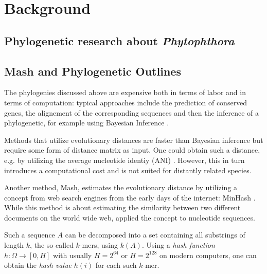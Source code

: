 
\chapter{Background}
  \label{sec:background}

\section{Phylogenetic research about \textit{Phytophthora}}


\section{Mash and Phylogenetic Outlines}
The phylogenies discussed above are expensive both in terms of labor and in
terms of computation: typical approaches include the prediction of conserved
genes, the alignement of the corresponding sequences and then the inference of a
phylogenetic, for example using Bayesian Inference
\cite{abadPhytophthoraTaxonomicPhylogenetic2023a,winkworthComparativeAnalysesComplete2022}.

Methods that utilize evolutionary distances
\cite{saitouNeighborjoiningMethodNew1987} are faster  than Bayesian
inference but require some form of distance matrix as input. One could obtain
such a distance, e.g. by utilizing the average nucleotide identiy (ANI)
\cite{leeOrthoANIImprovedAlgorithm2016}. However, this in turn introduces a
computational cost and is not suited for distantly related species.

Another method, Mash, estimates the evolutionary distance by utilizing a concept
from web search engines from the early days of the internet: MinHash
\cite{broderResemblanceContainmentDocuments1998a,ondovMashFastGenome2016}. While
this method is about estimating the similarity between two different documents
on the world wide web,  applied the concept
to nucleotide sequences.

Such a sequence $A$ can be decomposed into a set containing all substrings of
length $k$, the so called $k$-mers, using $k(A)$.  Using a \textit{hash function} $h: \Omega \rightarrow [0, H]$
with usually $H=2^{64}$ or $H=2^{128}$ on modern computers, one can obtain the
\textit{hash value} $h(i)$ for each such $k$-mer.

